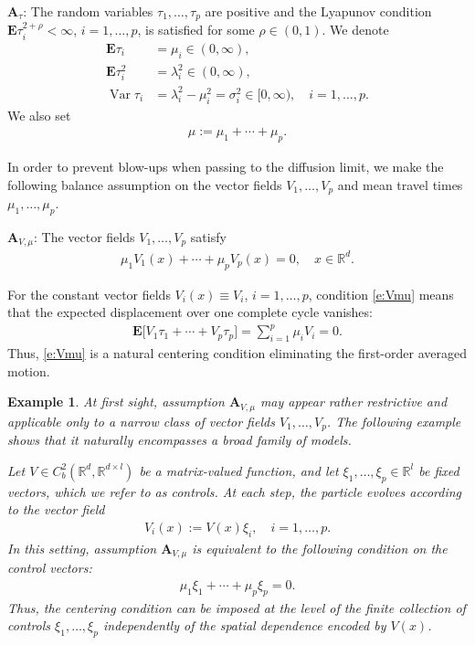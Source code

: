 \documentclass[10pt]{article}
\newcommand{\E}{\mathbf{E}}
\newcommand{\1}{1\!\!\!\;{\rm I}}
\theoremstyle{plain}
\newtheorem{exa}[thm]{Example}
\theoremstyle{definition}
\newcommand{\ba}{\begin{equation}\begin{aligned}}
\newcommand{\ea}{\end{aligned}\end{equation}}
\DeclareMathOperator{\Var}{Var}
\numberwithin{equation}{section}
\begin{document}
\noindent
$\mathbf{A}_\tau$:
The random variables $\tau_1,\dots,\tau_{p}$ are positive and the Lyapunov condition
$\E \tau_i^{2+\rho}<\infty$, $i=1,\dots, p$, is satisfied for some $\rho\in (0,1)$.
We denote
\ba
\E \tau_i   &=\mu_i\in (0,\infty),\\
\E \tau_i^2 &=\lambda_i^2\in (0,\infty),\\
\Var \tau_i &=\lambda_i^2-\mu_i^2=\sigma_i^2\in[0,\infty),\quad  i=1,\dots, p.
\ea
We also set
\ba
\mu:=\mu_1+\cdots+\mu_{p}.
\ea




In order to prevent blow-ups when passing to the diffusion limit, we make the following
balance assumption on the vector fields $V_1,\dots,V_{p}$ and mean travel times  $\mu_1,\dots,\mu_{p}$.

\noindent
$\mathbf{A}_{V,\mu}$:
The vector fields $V_1,\dots,V_{p}$ satisfy
\ba
\label{e:Vmu}
\mu_1 V_1(x)+\cdots+\mu_{p}V_{p}(x)=0,\quad x\in\mathbb R^d.
\ea



For the constant vector fields $V_i(x)\equiv V_i$, $i=1,\dots,p$,
condition \eqref{e:Vmu} means that the expected displacement over one complete cycle vanishes:
\ba
\E\Big[V_1\tau_1 +\cdots+V_{p}\tau_{p} \Big]=\sum_{i=1}^p \mu_i V_i=0.
\ea
Thus, \eqref{e:Vmu} is a natural centering condition eliminating the first-order averaged motion.


\begin{exa}
At first sight, assumption $\mathbf{A}_{V,\mu}$ may appear rather restrictive and applicable
only to a narrow class of vector fields $V_1,\dots,V_p$. The following example shows that it naturally
encompasses a broad family of models.

Let $V\in C_b^2(\mathbb R^d,\mathbb R^{d\times l})$ be a matrix-valued function, and let
$\xi_1,\dots,\xi_p\in\mathbb R^l$ be fixed vectors, which we refer to as \emph{controls}. At each step,
the particle evolves according to the vector field
\ba
V_i(x):=V(x)\xi_i,\quad i=1,\dots,p.
\ea
In this setting, assumption $\mathbf{A}_{V,\mu}$ is equivalent to the following condition on the control vectors:
\ba
\mu_1\xi_1+\cdots+\mu_p\xi_p=0.
\ea
Thus, the centering condition can be imposed at the level of the finite collection of controls
$\xi_1,\dots,\xi_p$ independently of the spatial dependence encoded by $V(x)$.
\end{exa}
\end{document}
